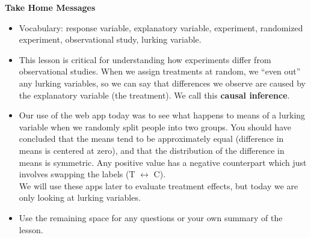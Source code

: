 \begin{center}
  {\bf Take Home Messages}
\end{center}
  \begin{itemize}
  \item Vocabulary:  response variable, explanatory variable,
    experiment, randomized experiment, observational study, lurking
    variable.
  \item This lesson is critical for understanding how experiments
    differ from observational studies.  When we assign treatments at
    random, we ``even out'' any lurking variables, so we can say that
    differences we observe are caused by the explanatory variable (the
    treatment). We call this {\bf causal inference}.
  \item  Our use of the web app today was to see what happens to means
    of a lurking variable when we randomly split people into two
    groups. You should have concluded that the means tend to be
    approximately equal (difference in means is centered at zero), and
    that the distribution of the difference in means is symmetric. Any
    positive value has a negative counterpart which just involves
    swapping the labels (T $\longleftrightarrow$ C).\\
   We will use these apps later to evaluate treatment effects, but
   today we are only looking at  lurking   variables. 
 \item 
  Use the remaining space for any questions or your own summary of the
  lesson. 
  \end{itemize}
  



